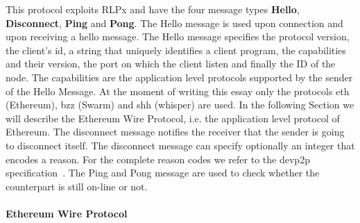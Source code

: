 This protocol exploits RLPx and have the four message types
\textbf{Hello}, \textbf{Disconnect}, \textbf{Ping} and \textbf{Pong}.
The Hello message is used upon connection and upon receiving a hello message.
The Hello message specifies the protocol version, the client's id,
a string that uniquely identifies a client program, the capabilities and their
version, the port on which the client listen and finally the ID of the node.
The capabilities are the application level protocols supported by the sender
of the Hello Message. At the moment of writing this essay only the protocols
eth (Ethereum), bzz (Swarm) and shh (whisper) are used. In the following
Section we will describe the Ethereum Wire Protocol, i.e. the application
level protocol of Ethereum.
The disconnect message notifies the receiver that the sender is going to
disconnect itself. The disconnect message can specify optionally an
integer that encodes a reason.
For the complete reason codes we refer to the devp2p specification~\cite{}.
The Ping and Pong message are used to check whether the counterpart is still
on-line or not.

\paragraph{Ethereum Wire Protocol}
